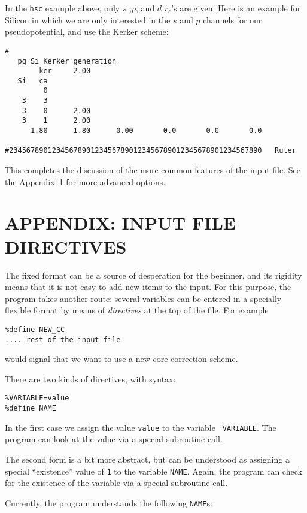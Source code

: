 \documentclass[11pt]{article}
\begin{document}
In the {\tt hsc} example above, only $s$ ,$p$, and $d$ $r_c$'s are
given. Here is an example for Silicon in which we are only interested
in the $s$ and $p$ channels for our pseudopotential, and use the Kerker
scheme:

\begin{verbatim}
# 
   pg Si Kerker generation
        ker     2.00
   Si   ca
         0
    3    3
    3    0      2.00
    3    1      2.00
      1.80      1.80      0.00       0.0       0.0       0.0

#23456789012345678901234567890123456789012345678901234567890   Ruler
\end{verbatim}


This completes the discussion of the more common features of the input
file. See the Appendix~\ref{sec:directives} for more advanced options.

\section{APPENDIX: INPUT FILE DIRECTIVES}
\label{sec:directives}

The fixed format can be a source of desperation for the beginner, and
its rigidity means that it is not easy to add new items to the
input. For this purpose, the program takes another route: several
variables can be entered in a specially flexible format by means of
{\sl directives} at the top of the file. For example

\begin{verbatim}
%define NEW_CC
.... rest of the input file
\end{verbatim}

would signal that we want to use a new core-correction scheme.

There are two kinds of directives, with syntax:
\begin{verbatim}
%VARIABLE=value
%define NAME
\end{verbatim}

In the first case we assign the value {\tt value} to the variable {\tt
 VARIABLE}. The program can look at the value via a special
 subroutine call.

The second form is a bit more abstract, but can be understood as
assigning a special ``existence'' value of {\tt 1} to the variable
{\tt NAME}.  Again, the program can check for the existence of the
variable via a special subroutine call.

Currently, the program understands the following {\tt NAME}s:
\end{document}
